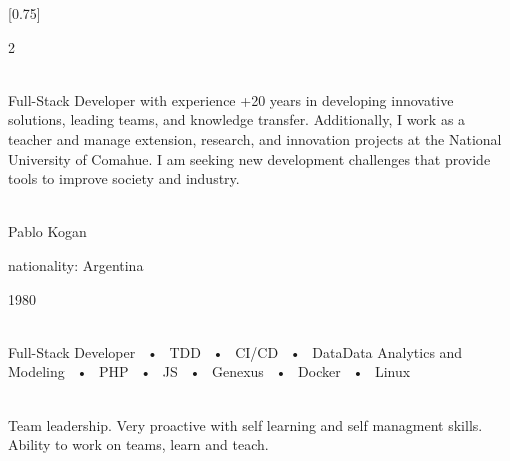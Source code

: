 \documentclass[lighthipster]{simplehipstercv}
\begin{document}
\setlength{\columnsep}{1.5cm}
[0.75]
\begin{paracol}{2}

\paracolbackgroundoptions


\footnotesize
{\setasidefontcolour
\flushright
\begin{center}
\end{center}

\\[0.5em]

{\footnotesize
Full-Stack Developer with experience +20 years in developing innovative solutions, leading teams, and knowledge transfer. Additionally, I work as a teacher and manage extension, research, and innovation projects at the National University of Comahue. I am seeking new development challenges that provide tools to improve society and industry.
}
\bigskip

 \\[0.5em]
Pablo Kogan

nationality: Argentina

1980

\bigskip

 \\[0.5em]

Full-Stack Developer ~•~ TDD ~•~ CI/CD ~•~ DataData Analytics and Modeling ~•~ PHP ~•~ JS  ~•~ Genexus ~•~ Docker ~•~ Linux

\bigskip



\bigskip

\\[0.5em]

Team leadership.
Very proactive with self learning 
and self managment skills.
Ability to work on teams, learn and teach.
\bigskip

\\[0.5em]

}
\end{paracol}
\end{document}
